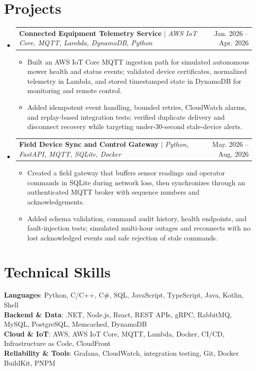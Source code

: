\documentclass[letterpaper,11pt]{article}
\makeatletter
\newcommand{\resumeItem}[1]{
  \item\small{
    {#1 \vspace{-2pt}}
  }
}
\newcommand{\resumeProjectHeading}[2]{
    \item
    \begin{tabular*}{0.97\textwidth}{l@{\extracolsep{\fill}}r}
      \small#1 & #2 \\
    \end{tabular*}\vspace{-7pt}
}
\newcommand{\resumeSubHeadingListStart}{\begin{itemize}[leftmargin=0.15in, label={}]}
\newcommand{\resumeSubHeadingListEnd}{\end{itemize}}
\newcommand{\resumeItemListStart}{\begin{itemize}}
\newcommand{\resumeItemListEnd}{\end{itemize}\vspace{-5pt}}
\makeatother
\begin{document}
\section{Projects}
\resumeSubHeadingListStart
\resumeProjectHeading
{\textbf{Connected Equipment Telemetry Service} $|$ \emph{AWS IoT Core, MQTT, Lambda, DynamoDB, Python}}{Jan. 2026 -- Apr. 2026}
\resumeItemListStart
\resumeItem{Built an AWS IoT Core MQTT ingestion path for simulated autonomous mower health and status events; validated device certificates, normalized telemetry in Lambda, and stored timestamped state in DynamoDB for monitoring and remote control.}
\resumeItem{Added idempotent event handling, bounded retries, CloudWatch alarms, and replay-based integration tests; verified duplicate delivery and disconnect recovery while targeting under-30-second stale-device alerts.}
\resumeItemListEnd
\resumeProjectHeading
{\textbf{Field Device Sync and Control Gateway} $|$ \emph{Python, FastAPI, MQTT, SQLite, Docker}}{May. 2026 -- Aug. 2026}
\resumeItemListStart
\resumeItem{Created a field gateway that buffers sensor readings and operator commands in SQLite during network loss, then synchronizes through an authenticated MQTT broker with sequence numbers and acknowledgements.}
\resumeItem{Added schema validation, command audit history, health endpoints, and fault-injection tests; simulated multi-hour outages and reconnects with no lost acknowledged events and safe rejection of stale commands.}
\resumeItemListEnd
\resumeSubHeadingListEnd

\section{Technical Skills}
\begin{itemize}[leftmargin=0.15in, label={}]
  \small{\item{
        \textbf{Languages}{: Python, C/C++, C\#, SQL, JavaScript, TypeScript, Java, Kotlin, Shell} \\
        \textbf{Backend \& Data}{: .NET, Node.js, React, REST APIs, gRPC, RabbitMQ, MySQL, PostgreSQL, Memcached, DynamoDB} \\
        \textbf{Cloud \& IoT}{: AWS, AWS IoT Core, MQTT, Lambda, Docker, CI/CD, Infrastructure as Code, CloudFront} \\
        \textbf{Reliability \& Tools}{: Grafana, CloudWatch, integration testing, Git, Docker BuildKit, PNPM}
        }}
\end{itemize}

\end{document}
